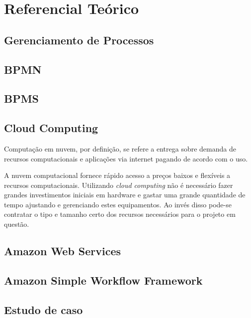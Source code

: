 \chapter{Referencial Teórico}

\section{Gerenciamento de Processos}

\section{BPMN}

\section{BPMS}

\section{Cloud Computing}

Computação em nuvem, por definição, se refere a entrega sobre demanda de recursos computacionais e aplicações via internet pagando de acordo com o uso.

A nuvem computacional fornece rápido acesso a preços baixos e flexíveis a recursos computacionais. Utilizando \textit{cloud computing} não é necessário fazer grandes investimentos iniciais em hardware e gastar uma grande quantidade de tempo ajustando e gerenciando estes equipamentos. Ao invés disso pode-se contratar o tipo e tamanho certo dos recursos necessários para o projeto em questão.



\section{Amazon Web Services}

\section{Amazon Simple Workflow Framework}

\section{Estudo de caso}

